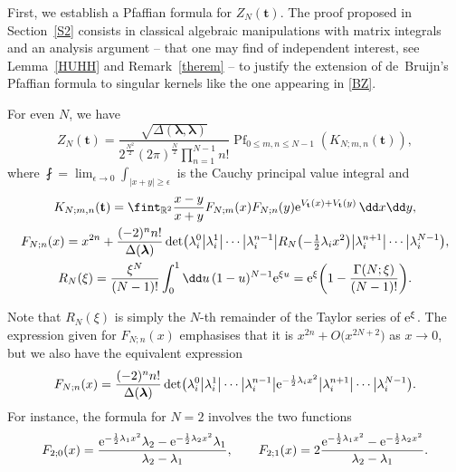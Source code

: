 First, we establish a Pfaffian formula for $Z_N(\mathbf{t})$. The proof proposed in Section~\ref{S2} consists in classical algebraic manipulations with matrix integrals and an analysis argument -- that one may find of independent interest, see Lemma~\ref{HUHH} and Remark~\ref{therem} -- to justify the extension of de~Bruijn's Pfaffian formula \cite{deBruijn1955} to singular kernels like the one appearing in \eqref{BZ}.
\begin{Theorem}
\label{th:1} For even $N$, we have
\begin{equation}
\label{BZ} Z_N(\mathbf{t}) = \frac{\sqrt{\Delta(\boldsymbol{\lambda},\boldsymbol{\lambda})}}{2^{\frac{N^2}{2}} (2\pi)^{\frac{N}{2}}\prod_{n = 1}^{N - 1} n!} \operatorname{Pf}_{0 \leq m,n \leq N - 1}(K_{N;m,n}(\mathbf{t})),
\end{equation}
where $\fint = \lim_{\epsilon \rightarrow 0} \int_{|x + y| \geq \epsilon}$ is the Cauchy principal value integral and
\begin{gather*}
 K_{N;m,n}(\mathbf{t}) = \fint_{\mathbb{R}^2} \frac{x - y}{x + y} F_{N;m}(x)F_{N;n}(y) {\rm e}^{V_{\mathbf{t}}(x) + V_{\mathbf{t}}(y)}\,\dd x \dd y, \\
F_{N;n}(x) = x^{2n} + \frac{(-2)^n n!}{\Delta(\boldsymbol{\lambda})}\det\bigl(\lambda_i^0 \big| \lambda_i^1 \big| \cdots \big| \lambda_i^{n - 1} \big| R_N\bigl(-\tfrac{1}{2}\lambda_ix^2\bigr) \big| \lambda_i^{n + 1} \big| \cdots \big| \lambda_i^{N - 1}\bigr), \\
R_N(\xi) = \frac{\xi^N}{(N - 1)!} \int_{0}^{1} \dd u\, (1 - u)^{N - 1} {\rm e}^{\xi u} = {\rm e}^{\xi}\biggl(1 - \frac{\Gamma(N;\xi)}{(N - 1)!}\biggr).
\end{gather*}
\end{Theorem}

Note that $R_N(\xi)$ is simply the $N$-th remainder of the Taylor series of ${\rm e}^{\xi}$. The expression given for $F_{N;n}(x)$ emphasises that it is $x^{2n} + O\bigl(x^{2N + 2}\bigr)$ as $x \rightarrow 0$, but we also have the equivalent expression
\[
F_{N;n}(x) = \frac{(-2)^n n!}{\Delta(\boldsymbol{\lambda})} \det\bigl(\lambda_i^0 \big| \lambda_i^1 \big| \cdots \big| \lambda_i^{n - 1} \big| {\rm e}^{-\frac{1}{2}\lambda_i x^2} \big| \lambda_i^{n + 1} \big| \cdots \big| \lambda_i^{N - 1}\bigr).
\]
For instance, the formula for $N = 2$ involves the two functions
\[
F_{2;0}(x) = \frac{{\rm e}^{-\frac{1}{2}\lambda_1 x^2} \lambda_2 - {\rm e}^{-\frac{1}{2}\lambda_2 x^2}\lambda_1}{\lambda_2 - \lambda_1}, \qquad F_{2;1}(x) = 2 \frac{{\rm e}^{-\frac{1}{2}\lambda_1 x^2} - {\rm e}^{-\frac{1}{2}\lambda_2 x^2}}{\lambda_2 - \lambda_1} .
\]

